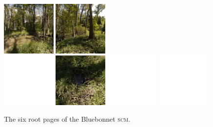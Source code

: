 \documentclass[oneside,10pt]{memoir}
\newcommand{\scm}     {\textsc{scm}}
\begin{document}
\begin{Spacing}{1.1}
\begin{figure}
  \includegraphics[width=0.24\textwidth]{fig/bluebonnet1.png}
  \includegraphics[width=0.24\textwidth]{fig/bluebonnet4.png}\\\vspace{1pt}
  \includegraphics[width=0.24\textwidth]{fig/blank.pdf}
  \includegraphics[width=0.24\textwidth]{fig/bluebonnet3.png}
  \includegraphics[width=0.24\textwidth]{fig/blank.pdf}
  \includegraphics[width=0.24\textwidth]{fig/blank.pdf}
  \caption{The six root pages of the Bluebonnet \scm.}
  \label{fig:sixfaces}
\end{figure}


\end{Spacing}
\end{document}
